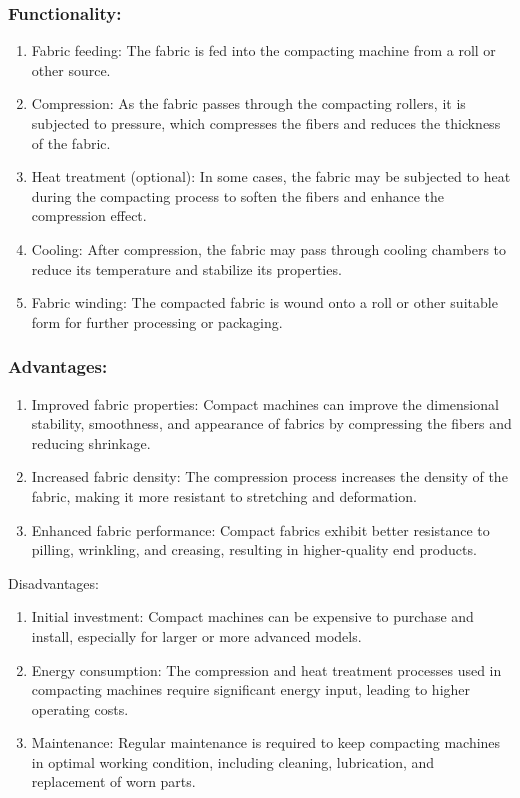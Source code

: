 \subsubsection{Functionality:}

\begin{enumerate}
\item
  Fabric feeding: The fabric is fed into the compacting machine from a
  roll or other source.
\item
  Compression: As the fabric passes through the compacting rollers, it
  is subjected to pressure, which compresses the fibers and reduces the
  thickness of the fabric.
\item
  Heat treatment (optional): In some cases, the fabric may be subjected
  to heat during the compacting process to soften the fibers and enhance
  the compression effect.
\item
  Cooling: After compression, the fabric may pass through cooling
  chambers to reduce its temperature and stabilize its properties.
\item
  Fabric winding: The compacted fabric is wound onto a roll or other
  suitable form for further processing or packaging.
\end{enumerate}

\subsubsection{Advantages:}

\begin{enumerate}
\item
  Improved fabric properties: Compact machines can improve the
  dimensional stability, smoothness, and appearance of fabrics by
  compressing the fibers and reducing shrinkage.
\item
  Increased fabric density: The compression process increases the
  density of the fabric, making it more resistant to stretching and
  deformation.
\item
  Enhanced fabric performance: Compact fabrics exhibit better resistance
  to pilling, wrinkling, and creasing, resulting in higher-quality end
  products.
\end{enumerate}


Disadvantages:


\begin{enumerate}
\item
  Initial investment: Compact machines can be expensive to purchase and
  install, especially for larger or more advanced models.
\item
  Energy consumption: The compression and heat treatment processes used
  in compacting machines require significant energy input, leading to
  higher operating costs.
\item
  Maintenance: Regular maintenance is required to keep compacting
  machines in optimal working condition, including cleaning,
  lubrication, and replacement of worn parts.
\end{enumerate}

